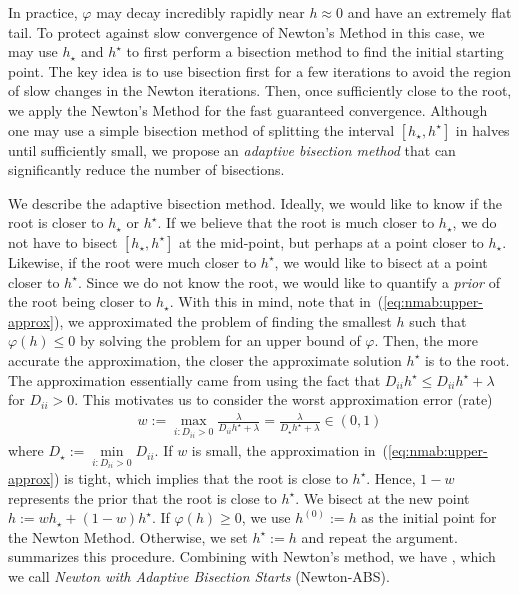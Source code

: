 In practice, $\varphi$ may decay incredibly rapidly near $h \approx 0$ and have an extremely flat tail.
To protect against slow convergence of Newton's Method in this case,
we may use $h_\star$ and $h^\star$ to first perform a bisection method to find the initial starting point.
The key idea is to use bisection first for a few iterations 
to avoid the region of slow changes in the Newton iterations.
Then, once sufficiently close to the root, we apply the Newton's Method for the fast guaranteed convergence.
Although one may use a simple bisection method of splitting the interval $[h_\star, h^\star]$ in halves
until sufficiently small, we propose an \emph{adaptive bisection method} 
that can significantly reduce the number of bisections.

We describe the adaptive bisection method.
Ideally, we would like to know if the root is closer to $h_\star$ or $h^\star$.
If we believe that the root is much closer to $h_\star$,
we do not have to bisect $[h_\star, h^\star]$ at the mid-point, 
but perhaps at a point closer to $h_\star$.
Likewise, if the root were much closer to $h^\star$, 
we would like to bisect at a point closer to $h^\star$.
Since we do not know the root, we would like to quantify a \emph{prior} of 
the root being closer to $h_\star$.
With this in mind, note that in~(\ref{eq:nmab:upper-approx}), we 
approximated the problem of finding the smallest $h$ such that $\varphi(h) \leq 0$
by solving the problem for an upper bound of $\varphi$.
Then, the more accurate the approximation, the closer the approximate solution $h^\star$ is to the root.
The approximation essentially came from using the fact that $D_{ii} h^\star \leq D_{ii} h^\star + \lambda$
for $D_{ii} > 0$.
This motivates us to consider the worst approximation error (rate)
\begin{align*}
    w
    := 
    \max\limits_{i: D_{ii} > 0} \frac{\lambda}{D_{ii} h^\star + \lambda}
    =
    \frac{\lambda}{D_\star h^\star + \lambda}
    \in 
    (0,1)
\end{align*}
where $D_\star := \min\limits_{i : D_{ii} > 0} D_{ii}$.
If $w$ is small, the approximation in~(\ref{eq:nmab:upper-approx}) is tight,
which implies that the root is close to $h^\star$.
Hence, $1-w$ represents the prior that the root is close to $h^\star$.
We bisect at the new point $h := wh_\star + (1-w)h^\star$.
If $\varphi(h) \geq 0$, we use $h^{(0)} := h$ as the initial point for the Newton Method.
Otherwise, we set $h^\star := h$ and repeat the argument.
 summarizes this procedure.
Combining  with Newton's method,
we have ,
which we call \emph{Newton with Adaptive Bisection Starts} (Newton-ABS).

